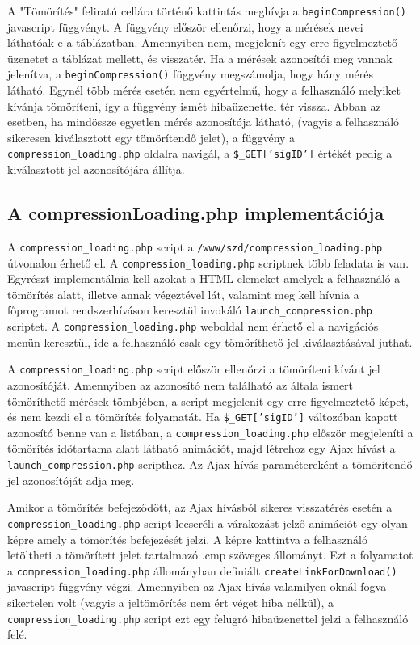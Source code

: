 \documentclass[oneside,titlepage,12pt,a4paper]{report}
\begin{document}
\par A "Tömörítés" feliratú cellára történő kattintás meghívja a \texttt{beginCompression()} javascript függvényt. A függvény először ellenőrzi, hogy a mérések nevei láthatóak-e a táblázatban. Amennyiben nem, megjelenít egy erre figyelmeztető üzenetet a táblázat mellett, és visszatér. Ha a mérések azonosítói meg vannak jelenítva, a \texttt{beginCompression()} függvény megszámolja, hogy hány mérés látható. Egynél több mérés esetén nem egyértelmű, hogy a felhasználó melyiket kívánja tömöríteni, így a függvény ismét hibaüzenettel tér vissza. Abban az esetben, ha mindössze egyetlen mérés azonosítója látható, (vagyis a felhasználó sikeresen kiválasztott egy tömörítendő jelet), a függvény a \texttt{compression\_loading.php} oldalra navigál, a \texttt{\$\_GET['sigID']} értékét pedig a kiválasztott jel azonosítójára állítja.   

\subsection{A compressionLoading.php implementációja}

A \texttt{compression\_loading.php} script a \texttt{/www/szd/compression\_loading.php} útvonalon érhető el. A \texttt{compression\_loading.php} scriptnek több feladata is van. Egyrészt implementálnia kell azokat a HTML elemeket amelyek a felhasználó a tömörítés alatt, illetve annak végeztével lát, valamint meg kell hívnia a főprogramot rendszerhíváson keresztül invokáló \texttt{launch\_compression.php} scriptet. A \texttt{compression\_loading.php} weboldal nem érhető el a navigációs menün keresztül, ide a felhasználó csak egy tömöríthető jel kiválasztásával juthat. 
\par A \texttt{compression\_loading.php} script először ellenőrzi a tömöríteni kívánt jel azonosítóját. Amennyiben az azonosító nem található az általa ismert tömöríthető mérések tömbjében, a script megjelenít egy erre figyelmeztető képet, és nem kezdi el a tömörítés folyamatát. Ha \texttt{\$\_GET['sigID']} változóban kapott azonosító benne van a listában, a \texttt{compression\_loading.php} először megjeleníti a tömörítés időtartama alatt látható animációt, majd létrehoz egy Ajax hívást a \texttt{launch\_compression.php} scripthez. Az Ajax hívás paramétereként a tömörítendő jel azonosítóját adja meg. 
\par Amikor a tömörítés befejeződött, az Ajax hívásból sikeres visszatérés esetén a \texttt{compression\_loading.php} script lecseréli a várakozást jelző animációt egy olyan képre amely a tömörítés befejezését jelzi. A képre kattintva a felhasználó letöltheti a tömörített jelet tartalmazó .cmp szöveges állományt. Ezt a folyamatot a \texttt{compression\_loading.php} állományban definiált \texttt{createLinkForDownload()} javascript függvény végzi. Amennyiben az Ajax hívás valamilyen oknál fogva sikertelen volt (vagyis a jeltömörítés nem ért véget hiba nélkül), a \texttt{compression\_loading.php} script ezt egy felugró hibaüzenettel jelzi a felhasználó felé.
\end{document}
